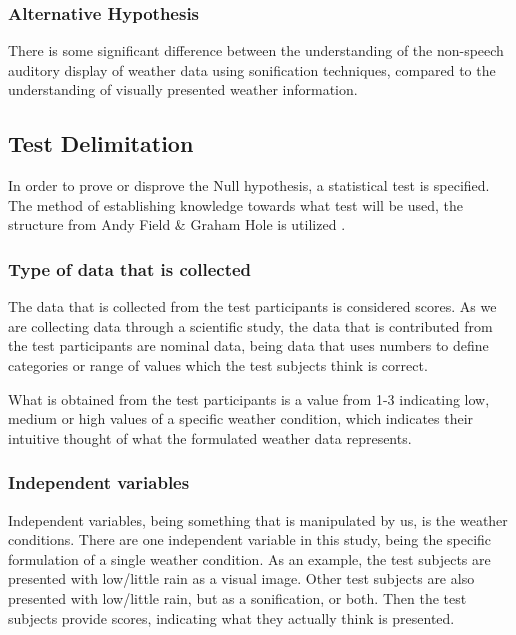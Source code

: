 

\subsubsection{Alternative Hypothesis} %
\label{ssub:alternative_hypothesis}

There is some significant difference between the understanding of the non-speech auditory display of weather data using sonification techniques, compared to the understanding of visually presented weather information.


\subsection{Test Delimitation} %
\label{ssub:test_delimitation}

In order to prove or disprove the Null hypothesis, a statistical test is specified.
The method of establishing knowledge towards what test will be used, the structure from Andy Field \& Graham Hole is utilized \cite[c.8][]{Field2003}.

\subsubsection{Type of data that is collected} %
\label{ssub:type_of_data_that_is_collected}

The data that is collected from the test participants is considered scores. 
As we are collecting data through a scientific study, the data that is contributed from the test participants are nominal data, being data that uses numbers to define categories or range of values which the test subjects think is correct.


What is obtained from the test participants is a value from 1-3 indicating low, medium or high values of a specific weather condition, which indicates their intuitive thought of what the formulated weather data represents.


\subsubsection{Independent variables} %
\label{ssub:independent_variables}

Independent variables, being something that is manipulated by us, is the weather conditions. 
There are one independent variable in this study, being the specific formulation of a single weather condition. 
As an example, the test subjects are presented with low/little rain as a visual image. 
Other test subjects are also presented with low/little rain, but as a sonification, or both. 
Then the test subjects provide scores, indicating what they actually think is presented.


